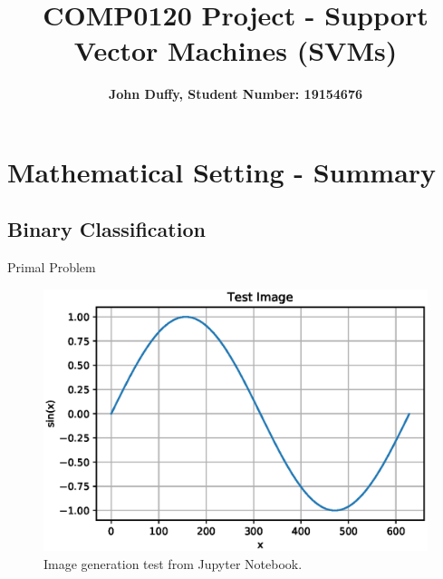 \documentclass[10pt, a4paper]{amsart}
\title{COMP0120 Project - Support Vector Machines (SVMs)}
\author{\textbf{John Duffy, Student Number: 19154676}}
\begin{document}
\maketitle

\section{Mathematical Setting - Summary}

\subsection{Binary Classification}\hfill

Primal Problem

\begin{figure}
	\centering	
	\includegraphics[width=1.0\textwidth]{test_image.eps}
	\caption{Image generation test from Jupyter Notebook.}
\end{figure}
\end{document}
